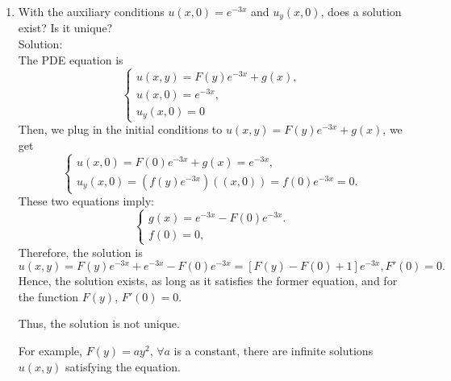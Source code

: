 \documentclass[12pt]{article}%
\begin{document}
\begin{enumerate}
\begin{enumerate}
\begin{enumerate}
            \item With the auxiliary conditions $u\left(x,0\right) = e^{-3x}$ and $u_y\left(x,0\right)$, does a solution exist? Is it unique? \smallskip \\
            Solution:\\
            The PDE equation is 
            \begin{equation*}
                \begin{cases}
                    u(x,y)=F(y)e^{-3x}+g(x),
                    \\
                    u(x,0)=e^{-3x},
                    \\
                    u_{y}(x,0)=0
                \end{cases}
            \end{equation*}
            Then, we plug in the initial conditions to $u(x,y)=F(y)e^{-3x}+g(x)$, we get
            \begin{equation*}
                \begin{cases}
                    u(x,0)=F(0)e^{-3x}+g(x)=e^{-3x},
                    \\
                    u_{y}(x,0)=(f(y)e^{-3x})((x,0))=f(0)e^{-3x}=0.
                \end{cases}
            \end{equation*}
            These two equations imply:
            \begin{equation*}
                \begin{cases}
                    g(x)=e^{-3x}-F(0)e^{-3x}.
                    \\
                    f(0)=0,
                \end{cases}
            \end{equation*}
            Therefore, the solution is 
           \[u(x,y)=F(y)e^{-3x}+e^{-3x}-F(0)e^{-3x}=[F(y)-F(0)+1]e^{-3x}, F'(0)=0.\]
           Hence, the solution exists, as long as it satisfies the former
           equation, and for the function $F(y)$, $F'(0)=0$.
           
           Thus, the solution is not unique. 
           
           For example, $F(y)=ay^2$, $\forall a $ is a constant, there are infinite solutions $u(x,y)$ satisfying the equation.

            
        \end{enumerate}
    \end{enumerate}


\end{enumerate}
\end{document}
